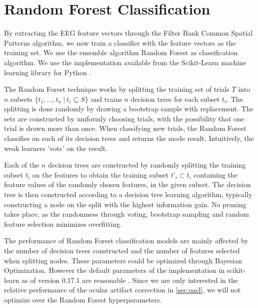 \section{Random Forest Classification}\label{sec:randomforest}
By extracting the EEG feature vectors through the Filter Bank Common Spatial Patterns algorithm, we now train a classifier with the feature vectors as the training set.
We use the ensemble algorithm Random Forest as classification algorithm. We use the implementation available from the Scikit-Learn machine learning library for Python \cite{scikit-learn}.

The Random Forest technique works by splitting the training set of trials $T$ into $n$ subsets $\{t_1,…,t_n \ | \ t_i \subseteq S\}$ and trains $n$ decision trees for each subset $t_i$. The splitting is done randomly by drawing a bootstrap sample with replacement. The sets are constructed by uniformly choosing trials, with the possibility that one trial is drawn more than once. When classifying new trials, the Random Forest classifies on each of its decision trees and returns the mode result. Intuitively, the weak learners 'vote' on the result.

Each of the $n$ decision trees are constructed by randomly splitting the training subset $t_i$ on the features to obtain the training subset $t’_i \subset t_i$ containing the feature values of the randomly chosen features, in the given subset. The decision tree is then constructed according to a decision tree learning algorithm, typically constructing a node on the split with the highest information gain. No pruning takes place, as the randomness through voting, bootstrap sampling and random feature selection minimizes overfitting.

The performance of Random Forest classification models are mainly affected by the number of decision trees constructed and the number of features selected when splitting nodes. These parameters could be optimized through Bayesian Optimization. However the default parameters of the implementation in scikit-learn \citep{scikit-learn} as of version 0.17.1 are reasonable \citep{bernard2009influence}. Since we are only interested in the relative performance of the ocular artifact correction in \cref{sec:oacl}, we will not optimize over the Random Forest hyperparameters.
